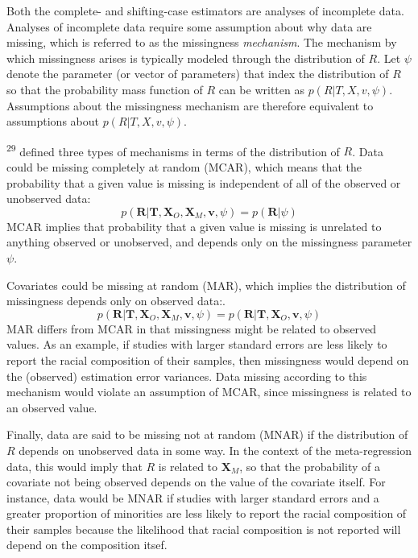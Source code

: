 \documentclass[
]{article}
\begin{document}
Both the complete- and shifting-case estimators are analyses of incomplete data.
Analyses of incomplete data require some assumption about why data are missing, which is referred to as the missingness \emph{mechanism}.
The mechanism by which missingness arises is typically modeled through the distribution of \(R\).
Let \(\psi\) denote the parameter (or vector of parameters) that index the distribution of \(R\) so that the probability mass function of \(R\) can be written as \(p(R | T, X, v, \psi)\).
Assumptions about the missingness mechanism are therefore equivalent to assumptions about \(p(R | T, X, v, \psi)\).

\textsuperscript{29} defined three types of mechanisms in terms of the distribution of \(R\).
Data could be missing completely at random (MCAR), which means that the probability that a given value is missing is independent of all of the observed or unobserved data:
\[
  p(\mathbf{R} | \mathbf{T}, \mathbf{X}_O, \mathbf{X}_M, \mathbf{v}, \psi) = p(\mathbf{R} | \psi)
\]
MCAR implies that probability that a given value is missing is unrelated to anything observed or unobserved, and depends only on the missingness parameter \(\psi\).

Covariates could be missing at random (MAR), which implies the distribution of missingness depends only on observed data:.
\[
  p(\mathbf{R} | \mathbf{T}, \mathbf{X}_O, \mathbf{X}_M, \mathbf{v}, \psi) = 
  p(\mathbf{R} | \mathbf{T}, \mathbf{X}_O,\mathbf{v}, \psi)
\]
MAR differs from MCAR in that missingness might be related to observed values.
As an example, if studies with larger standard errors are less likely to report the racial composition of their samples, then missingness would depend on the (observed) estimation error variances.
Data missing according to this mechanism would violate an assumption of MCAR, since missingness is related to an observed value.

Finally, data are said to be missing not at random (MNAR) if the distribution of \(R\) depends on unobserved data in some way.
In the context of the meta-regression data, this would imply that \(R\) is related to \(\mathbf{X}_M\), so that the probability of a covariate not being observed depends on the value of the covariate itself.
For instance, data would be MNAR if studies with larger standard errors and a greater proportion of minorities are less likely to report the racial composition of their samples because the likelihood that racial composition is not reported will depend on the composition itsef.
\end{document}
